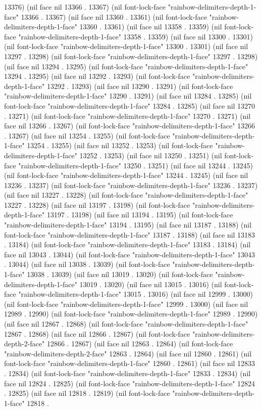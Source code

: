 13376) (nil face nil 13366 . 13367) (nil font-lock-face "rainbow-delimiters-depth-1-face" 13366 . 13367) (nil face nil 13360 . 13361) (nil font-lock-face "rainbow-delimiters-depth-1-face" 13360 . 13361) (nil face nil 13358 . 13359) (nil font-lock-face "rainbow-delimiters-depth-1-face" 13358 . 13359) (nil face nil 13300 . 13301) (nil font-lock-face "rainbow-delimiters-depth-1-face" 13300 . 13301) (nil face nil 13297 . 13298) (nil font-lock-face "rainbow-delimiters-depth-1-face" 13297 . 13298) (nil face nil 13294 . 13295) (nil font-lock-face "rainbow-delimiters-depth-1-face" 13294 . 13295) (nil face nil 13292 . 13293) (nil font-lock-face "rainbow-delimiters-depth-1-face" 13292 . 13293) (nil face nil 13290 . 13291) (nil font-lock-face "rainbow-delimiters-depth-1-face" 13290 . 13291) (nil face nil 13284 . 13285) (nil font-lock-face "rainbow-delimiters-depth-1-face" 13284 . 13285) (nil face nil 13270 . 13271) (nil font-lock-face "rainbow-delimiters-depth-1-face" 13270 . 13271) (nil face nil 13266 . 13267) (nil font-lock-face "rainbow-delimiters-depth-1-face" 13266 . 13267) (nil face nil 13254 . 13255) (nil font-lock-face "rainbow-delimiters-depth-1-face" 13254 . 13255) (nil face nil 13252 . 13253) (nil font-lock-face "rainbow-delimiters-depth-1-face" 13252 . 13253) (nil face nil 13250 . 13251) (nil font-lock-face "rainbow-delimiters-depth-1-face" 13250 . 13251) (nil face nil 13244 . 13245) (nil font-lock-face "rainbow-delimiters-depth-1-face" 13244 . 13245) (nil face nil 13236 . 13237) (nil font-lock-face "rainbow-delimiters-depth-1-face" 13236 . 13237) (nil face nil 13227 . 13228) (nil font-lock-face "rainbow-delimiters-depth-1-face" 13227 . 13228) (nil face nil 13197 . 13198) (nil font-lock-face "rainbow-delimiters-depth-1-face" 13197 . 13198) (nil face nil 13194 . 13195) (nil font-lock-face "rainbow-delimiters-depth-1-face" 13194 . 13195) (nil face nil 13187 . 13188) (nil font-lock-face "rainbow-delimiters-depth-1-face" 13187 . 13188) (nil face nil 13183 . 13184) (nil font-lock-face "rainbow-delimiters-depth-1-face" 13183 . 13184) (nil face nil 13043 . 13044) (nil font-lock-face "rainbow-delimiters-depth-1-face" 13043 . 13044) (nil face nil 13038 . 13039) (nil font-lock-face "rainbow-delimiters-depth-1-face" 13038 . 13039) (nil face nil 13019 . 13020) (nil font-lock-face "rainbow-delimiters-depth-1-face" 13019 . 13020) (nil face nil 13015 . 13016) (nil font-lock-face "rainbow-delimiters-depth-1-face" 13015 . 13016) (nil face nil 12999 . 13000) (nil font-lock-face "rainbow-delimiters-depth-1-face" 12999 . 13000) (nil face nil 12989 . 12990) (nil font-lock-face "rainbow-delimiters-depth-1-face" 12989 . 12990) (nil face nil 12867 . 12868) (nil font-lock-face "rainbow-delimiters-depth-1-face" 12867 . 12868) (nil face nil 12866 . 12867) (nil font-lock-face "rainbow-delimiters-depth-2-face" 12866 . 12867) (nil face nil 12863 . 12864) (nil font-lock-face "rainbow-delimiters-depth-2-face" 12863 . 12864) (nil face nil 12860 . 12861) (nil font-lock-face "rainbow-delimiters-depth-1-face" 12860 . 12861) (nil face nil 12833 . 12834) (nil font-lock-face "rainbow-delimiters-depth-1-face" 12833 . 12834) (nil face nil 12824 . 12825) (nil font-lock-face "rainbow-delimiters-depth-1-face" 12824 . 12825) (nil face nil 12818 . 12819) (nil font-lock-face "rainbow-delimiters-depth-1-face" 12818 . 